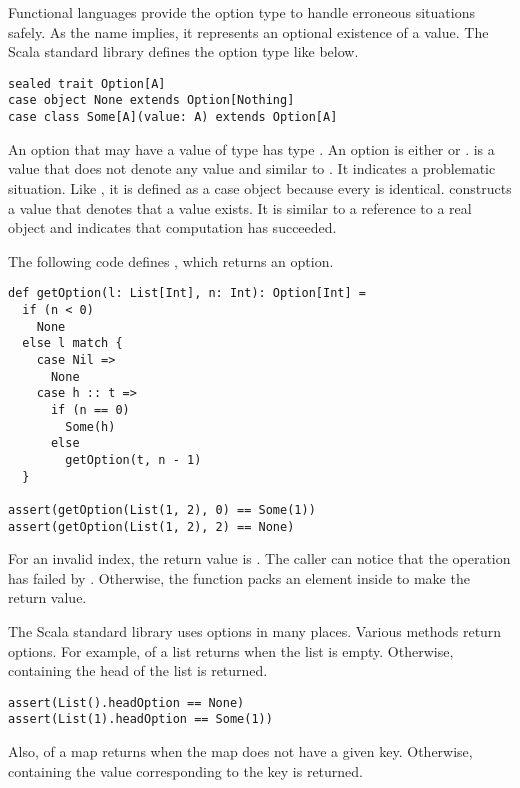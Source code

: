 Functional languages provide the option type to handle erroneous situations
safely. As the name implies, it represents an optional existence of a value.
The Scala standard library defines the option type like below.

\begin{verbatim}
sealed trait Option[A]
case object None extends Option[Nothing]
case class Some[A](value: A) extends Option[A]
\end{verbatim}

An option that may have a value of type  has type .
An option is either  or .
 is a value that does not denote any value and similar
to . It indicates a problematic situation. Like , it is
defined as a case object because every  is identical.  constructs a value that
denotes that a value exists. It is similar to a reference to a real object and
indicates that computation has succeeded.

The following code defines , which returns an option.

\begin{verbatim}
def getOption(l: List[Int], n: Int): Option[Int] =
  if (n < 0)
    None
  else l match {
    case Nil =>
      None
    case h :: t =>
      if (n == 0)
        Some(h)
      else
        getOption(t, n - 1)
  }

assert(getOption(List(1, 2), 0) == Some(1))
assert(getOption(List(1, 2), 2) == None)
\end{verbatim}

For an invalid index, the return value is . The caller can notice
that the operation has failed by .
Otherwise, the function packs
an element inside  to make the return value.

The Scala standard library uses options in many places. Various methods return options.
For example,  of a list returns  when the list is
empty. Otherwise,  containing the head of the list is returned.

\begin{verbatim}
assert(List().headOption == None)
assert(List(1).headOption == Some(1))
\end{verbatim}

Also,  of a map returns  when the map does not have a given key.
Otherwise,  containing the value corresponding to the key is
returned.

